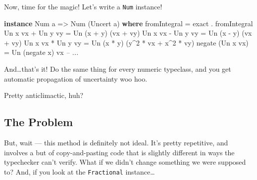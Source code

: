 \documentclass[]{article}
\newenvironment{Shaded}{}{}
\newcommand{\KeywordTok}[1]{\textcolor[rgb]{0.00,0.44,0.13}{\textbf{{#1}}}}
\newcommand{\DataTypeTok}[1]{\textcolor[rgb]{0.56,0.13,0.00}{{#1}}}
\newcommand{\DecValTok}[1]{\textcolor[rgb]{0.25,0.63,0.44}{{#1}}}
\newcommand{\CommentTok}[1]{\textcolor[rgb]{0.38,0.63,0.69}{\textit{{#1}}}}
\newcommand{\OtherTok}[1]{\textcolor[rgb]{0.00,0.44,0.13}{{#1}}}
\newcommand{\FunctionTok}[1]{\textcolor[rgb]{0.02,0.16,0.49}{{#1}}}
\newcommand{\NormalTok}[1]{{#1}}
\begin{document}
Now, time for the magic! Let's write a \texttt{Num} instance!

\begin{Shaded}
\begin{Highlighting}[]
\KeywordTok{instance} \DataTypeTok{Num} \NormalTok{a }\OtherTok{=>} \DataTypeTok{Num} \NormalTok{(}\DataTypeTok{Uncert} \NormalTok{a) }\KeywordTok{where}
    \NormalTok{fromIntegral      }\FunctionTok{=} \NormalTok{exact }\FunctionTok{.} \NormalTok{fromIntegral}
    \DataTypeTok{Un} \NormalTok{x vx }\FunctionTok{+} \DataTypeTok{Un} \NormalTok{y vy }\FunctionTok{=} \DataTypeTok{Un} \NormalTok{(x }\FunctionTok{+} \NormalTok{y)    (vx }\FunctionTok{+} \NormalTok{vy)}
    \DataTypeTok{Un} \NormalTok{x vx }\FunctionTok{-} \DataTypeTok{Un} \NormalTok{y vy }\FunctionTok{=} \DataTypeTok{Un} \NormalTok{(x }\FunctionTok{-} \NormalTok{y)    (vx }\FunctionTok{+} \NormalTok{vy)}
    \DataTypeTok{Un} \NormalTok{x vx }\FunctionTok{*} \DataTypeTok{Un} \NormalTok{y vy }\FunctionTok{=} \DataTypeTok{Un} \NormalTok{(x }\FunctionTok{*} \NormalTok{y)    (y}\FunctionTok{^}\DecValTok{2} \FunctionTok{*} \NormalTok{vx }\FunctionTok{+} \NormalTok{x}\FunctionTok{^}\DecValTok{2} \FunctionTok{*} \NormalTok{vy)}
    \NormalTok{negate (}\DataTypeTok{Un} \NormalTok{x vx)  }\FunctionTok{=} \DataTypeTok{Un} \NormalTok{(negate x) vx}
    \CommentTok{-- ...}
\end{Highlighting}
\end{Shaded}

And\ldots{}that's it! Do the same thing for every numeric typeclass, and
you get automatic propagation of uncertainty woo hoo.

Pretty anticlimactic, huh?

\subsection{The Problem}\label{the-problem}

But, wait --- this method is definitely not ideal. It's pretty
repetitive, and involves a but of copy-and-pasting code that is slightly
different in ways the typechecker can't verify. What if we didn't change
something we were supposed to? And, if you look at the
\texttt{Fractional} instance\ldots{}
\end{document}
